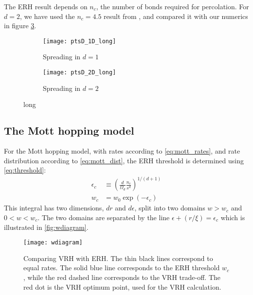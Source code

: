The ERH result depends on $n_c$, the number of bonds 
required for percolation.
For $d=2$, we have used the $n_c=4.5$ result from \cite{dalton_dependence_1964,*pike_percolation_1974}, 
and compared it with our numerics in figure \ref{fig:spread_2d}.

\begin{figure}
\begin{subfigure}{0.51\textwidth}
\texttt{[image: ptsD\_1D\_long]}
\caption{Spreading in $d{=}1$}
\label{fig:spread_1d}
\end{subfigure}
\begin{subfigure}{0.48\textwidth}
\texttt{[image: ptsD\_2D\_long]}
\caption{Spreading in $d{=}2$}
\label{fig:spread_2d}
\end{subfigure}
\caption[short]{long}
\end{figure}



\subsection{The Mott hopping model}

For the Mott hopping model, with rates according to \autoref{eq:mott_rates},
and rate distribution according to \autoref{eq:mott_dist}, the ERH 
threshold is determined using \autoref{eq:threshold}:
%
\begin{align}
\epsilon_c &\equiv \left( \frac{d}{\Omega_d} \frac{n_c}{s^d} \right)^{1/(d+1)} \\
w_c &= w_0\exp(-\epsilon_c) 
\end{align}
%
This integral has two dimensions, $dr$ and $d\epsilon$,
split into two domains 
${w>w_c}$ and ${0<w<w_c}$. The two domains are 
separated by the line ${\epsilon+(r/\xi)=\epsilon_c}$ which is illustrated in \autoref{fig:wdiagram}.

\begin{figure}
\texttt{[image: wdiagram]}
\caption[VRH vs ERH]{Comparing VRH with ERH. The thin black lines 
correspond to equal rates. The solid blue line corresponds to the
ERH threshold $w_c$, while the red dashed line corresponds to the
VRH trade-off. The red dot is the VRH optimum point, used for the
VRH calculation.}
\label{fig:wdiagram}
\end{figure}


